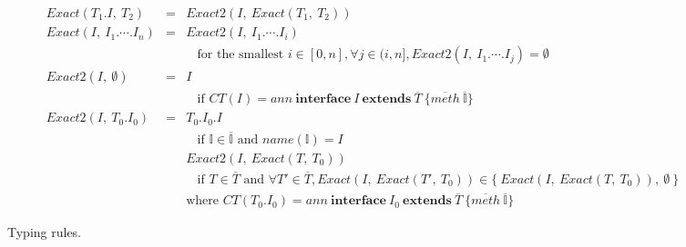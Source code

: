 \begin{figure*}[t]
\[\begin{array}{lll}
Exact(T_1.I,\ T_2) & = & Exact2(I,\ Exact(T_1,\ T_2)) \\
Exact(I,\ I_1.\cdots.I_n) & = & Exact2(I,\ I_1.\cdots.I_i) \\
& & \ \ \ \ \textrm{for the smallest }i\in[0,n],\forall j\in(i,n],Exact2(I,\ I_1.\cdots.I_j) = \emptyset \\
Exact2(I,\ \emptyset) & = & I \\
& & \ \ \ \ \textrm{if } CT(I) = ann\ \mathbf{interface}\ I\ \mathbf{extends}\ \overline{T}\ \{\overline{meth}\ \overline{\mathbb{I}}\}\\
Exact2(I,\ T_0.I_0) & = & T_0.I_0.I \\
& & \ \ \ \ \textrm{if } \mathbb{I}\in\overline{\mathbb{I}} \textrm{ and } name(\mathbb{I})=I \\
& & Exact2(I,\ Exact(T,\ T_0)) \\
& & \ \ \ \ \textrm{if } T\in\overline{T} \textrm{ and }\forall T'\in\overline{T}, Exact(I,\ Exact(T',\ T_0))\in\{\ Exact(I,\ Exact(T,\ T_0)),\ \emptyset\ \} \\
& & \textrm{where } CT(T_0.I_0) = ann\ \mathbf{interface}\ I_0\ \mathbf{extends}\ \overline{T}\ \{\overline{meth}\ \overline{\mathbb{I}}\}
\end{array}\]
\caption{Typing rules.}
\end{figure*}
